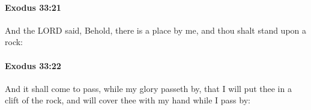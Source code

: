 		\paragraph{Exodus 33:21} %
			\label{EXODUS-33-21}

			And the LORD said, Behold, there is a place by me, and thou shalt stand upon a rock:


		\paragraph{Exodus 33:22} %
			\label{EXODUS-33-22}

			And it shall come to pass, while my glory passeth by, that I will put thee in a clift of the rock, and will cover thee with my hand while I pass by:


